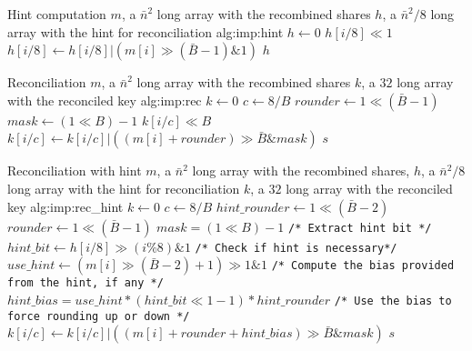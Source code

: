 \begin{b_algorithm}{Hint computation}
{$m$, a $\bar{n}^2$ long array with the recombined shares}
{$h$, a $\bar{n}^2/8$ long array with the hint for reconciliation}
{alg:imp:hint}
\STATE $h\gets 0$
\STATE $h[i/8] \ll 1$
\STATE $h[i/8] \gets h[i/8] | (m[i] \gg (\bar{B}-1) \& 1)$
\ENDFOR
\RETURN $h$
\end{b_algorithm}
\begin{b_algorithm}{Reconciliation}
{$m$, a $\bar{n}^2$ long array with the recombined shares}
{$k$, a $32$ long array with the reconciled key}
{alg:imp:rec}
\STATE $k\gets 0$
\STATE $c\gets8/B$
\STATE $rounder\gets1 \ll (\bar{B} - 1)$
\STATE $mask\gets(1 \ll B) - 1$
\STATE $k[i/c] \ll B$
\STATE $k[i/c] \gets k[i/c] | ((m[i]+rounder) \gg \bar{B} \& mask)$
\ENDFOR
\RETURN $s$
\end{b_algorithm}
\begin{b_algorithm}{Reconciliation with hint}
{$m$, a $\bar{n}^2$ long array with the recombined shares, $h$, a $\bar{n}^2/8$ long array with the hint for reconciliation}
{$k$, a $32$ long array with the reconciled key}
{alg:imp:rec_hint}
\STATE $k\gets 0$
\STATE $c\gets8/B$
\STATE $hint\_rounder\gets 1 \ll (\bar{B} - 2)$
\STATE $rounder\gets 1 \ll (\bar{B} - 1)$
\STATE $mask=(1 \ll B) - 1$
\STATE \texttt{/* Extract hint bit */}
\STATE $hint\_bit\gets  h[i/8] \gg (i\%8) \& 1$
\STATE \texttt{/* Check if hint is necessary*/}
\STATE $use\_hint\gets (m[i]\gg(\bar{B}-2) + 1) \gg 1 \& 1$
\STATE \texttt{/* Compute the bias provided from the hint, if any */}
\STATE $hint\_bias=use\_hint * (hint\_bit\ll1-1) * hint\_rounder$
\STATE \texttt{/* Use the bias to force rounding up or down */}
\STATE $k[i/c] \gets k[i/c] | ((m[i]+rounder+hint\_bias) \gg \bar{B} \& mask)$
\ENDFOR
\RETURN $s$
\end{b_algorithm}

